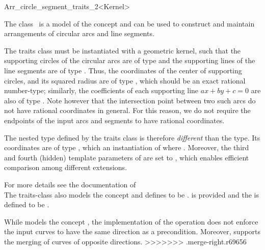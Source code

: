 
\ccRefPageBegin
\begin{ccRefClass}{Arr_circle_segment_traits_2<Kernel>}

\ccDefinition

The class \ccRefName\ is a model of the  concept
and can be used to construct and maintain arrangements of circular arcs
and line segments.

The traits class must be instantiated with a geometric kernel, such that
the supporting circles of the circular arcs are of type 
and the supporting lines of the line segments are of type .
Thus, the coordinates of the center of supporting circles, and its squared
radius are of type , which should be an exact rational
number-type; similarly, the coefficients of each supporting line
$ax + by + c = 0$ are also of type . Note however that
the intersection point between two such arcs do not have rational coordinates
in general. For this reason, we do not require the endpoints of the input arcs
and segments to have rational coordinates.

The nested  type defined by the traits class is therefore
{\em different} than the  type. Its coordinates are
of type , which an instantiation of 
 where .
Moreover, the third and fourth (hidden) template parameters of 
 are set to , which 
enables efficient comparison among different extensions. 

For more details see the documentation of \\


The traits-class also models the  concept
and defines  to
be .
 is provided and the 
is defined to be .

While \ccRefName{} models the concept
, the implementation of
the  operation does not enforce the input curves
to have the same direction as a precondition. Moreover, \ccRefName{}
supports the merging of curves of opposite directions.
>>>>>>> .merge-right.r69656


\end{ccRefClass}

